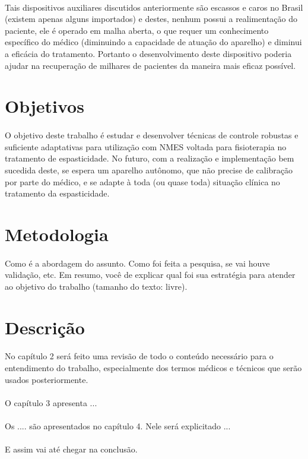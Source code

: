 \paragraph{}Tais dispositivos auxiliares discutidos anteriormente são escassos e caros no Brasil (existem apenas alguns importados) e destes, nenhum possui a realimentação do paciente, ele é operado em malha aberta, o que requer um conhecimento específico do médico (diminuindo a capacidade de atuação do aparelho) e diminui a eficácia do tratamento. Portanto o desenvolvimento deste dispositivo poderia ajudar na recuperação de milhares de pacientes da maneira mais eficaz possível.

\section{Objetivos}

\paragraph{}O objetivo deste trabalho é estudar e desenvolver técnicas de controle robustas e suficiente adaptativas para utilização com NMES voltada para fisioterapia no tratamento de espasticidade. No futuro, com a realização e implementação bem sucedida deste, se espera um aparelho autônomo, que não precise de calibração por parte do médico, e se adapte à toda (ou quase toda) situação clínica no tratamento da espasticidade.


\section{Metodologia}

\paragraph{}Como é a abordagem do assunto. Como foi feita a pesquisa, se vai houve validação, etc. Em resumo, você de explicar qual foi sua estratégia para atender ao objetivo do trabalho (tamanho do texto: livre).


\section{Descrição}

\paragraph{}No capítulo 2 será feito uma revisão de todo o conteúdo necessário para o entendimento do trabalho, especialmente dos termos médicos e técnicos que serão usados posteriormente.

\paragraph{}O capítulo 3 apresenta ...

\paragraph{}Os .... são apresentados no capítulo 4. Nele será explicitado ...

\paragraph{}E assim vai até chegar na conclusão.
